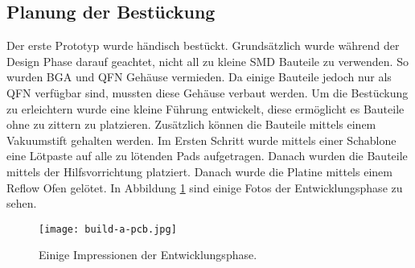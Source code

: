 \documentclass[praktikum,german]{hgbthesis}
\begin{document}
\subsection{Planung der Bestückung}
Der erste Prototyp wurde händisch bestückt. Grundsätzlich wurde während der Design Phase darauf geachtet, nicht all zu kleine SMD Bauteile zu verwenden. So wurden BGA und QFN Gehäuse vermieden. Da einige Bauteile jedoch nur als QFN verfügbar sind, mussten diese Gehäuse verbaut werden. Um die Bestückung zu erleichtern wurde eine kleine Führung entwickelt, diese ermöglicht es Bauteile ohne zu zittern zu platzieren. Zusätzlich können die Bauteile mittels einem Vakuumstift gehalten werden. Im Ersten Schritt wurde mittels einer Schablone eine Lötpaste auf alle zu lötenden Pads aufgetragen. Danach wurden die Bauteile mittels der Hilfsvorrichtung platziert. Danach wurde die Platine mittels einem Reflow Ofen gelötet. In Abbildung \ref{fig:board} sind einige Fotos der Entwicklungsphase zu sehen.


\begin{figure}[H]
\centering
\texttt{[image: build-a-pcb.jpg]}
\caption{Einige Impressionen der Entwicklungsphase.}
\label{fig:board}
\end{figure}
\end{document}

